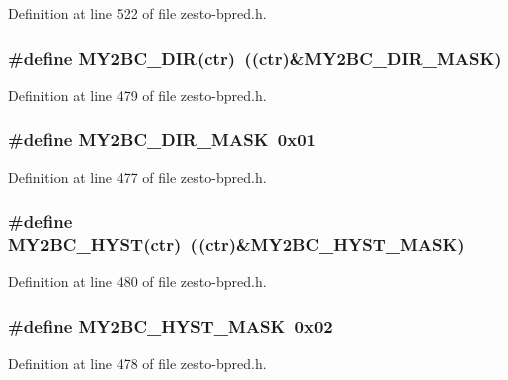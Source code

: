 Definition at line 522 of file zesto-bpred.h.
\subsubsection[{MY2BC\_\-DIR}]{\setlength{\rightskip}{0pt plus 5cm}\#define MY2BC\_\-DIR(ctr)~((ctr)\&MY2BC\_\-DIR\_\-MASK)}\label{zesto-bpred_8h_0ecda0251f34a526b1e45daf27c4d0d9}




Definition at line 479 of file zesto-bpred.h.
\subsubsection[{MY2BC\_\-DIR\_\-MASK}]{\setlength{\rightskip}{0pt plus 5cm}\#define MY2BC\_\-DIR\_\-MASK~0x01}\label{zesto-bpred_8h_d575efe27a358d2ed96a8611608a4ba6}




Definition at line 477 of file zesto-bpred.h.
\subsubsection[{MY2BC\_\-HYST}]{\setlength{\rightskip}{0pt plus 5cm}\#define MY2BC\_\-HYST(ctr)~((ctr)\&MY2BC\_\-HYST\_\-MASK)}\label{zesto-bpred_8h_c9c1aec004b8cbb04c9482ccb038cd0d}




Definition at line 480 of file zesto-bpred.h.
\subsubsection[{MY2BC\_\-HYST\_\-MASK}]{\setlength{\rightskip}{0pt plus 5cm}\#define MY2BC\_\-HYST\_\-MASK~0x02}\label{zesto-bpred_8h_fdf1125d6be60c842b7f273a15fa6903}




Definition at line 478 of file zesto-bpred.h.

